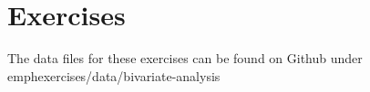 %
%
%
%

\section{Exercises}
\label{sec:bivariate-analysis-exercises}

The data files for these exercises can be found on Github under emph{exercises/data/bivariate-analysis}

